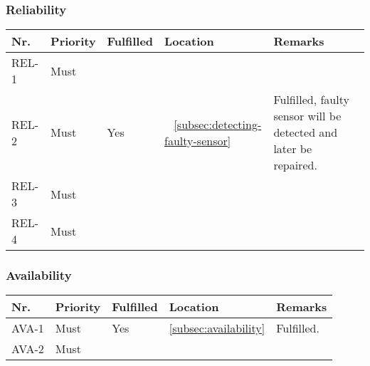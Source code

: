 	\subsubsection{Reliability}
	\begin{table}[H]
	\begin{tabular}{lllll}
	
	Nr.   & Priority & Fulfilled & Location & Remarks \\ \hline
	
	REL-1 & Must     & ~        & ~         & ~       \\ 
	
	REL-2 & Must     & Yes      & ~    \ref{subsec:detecting-faulty-sensor}     & Fulfilled, faulty sensor will be detected and later be repaired.       \\ 
	
	REL-3 & Must     & ~        & ~         & ~       \\ 
	
	REL-4 & Must     & ~        & ~         & ~       \\
	
	\end{tabular}
	\end{table}
	
	\subsubsection{Availability}
	\begin{table}[H]
	\begin{tabular}{lllll}
	
	Nr.   & Priority & Fulfilled & Location & Remarks \\ \hline
	
	AVA-1 & Must     & Yes        & \ref{subsec:availability}         & Fulfilled.       \\ 
	
	AVA-2 & Must     & ~        & ~         & ~       \\
	
	\end{tabular}
	\end{table}
	
